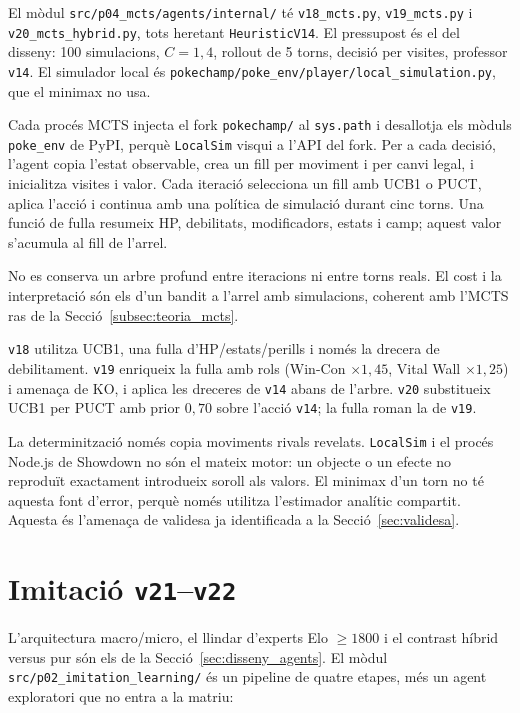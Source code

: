 El mòdul \texttt{src/p04\_mcts/agents/internal/} té \texttt{v18\_mcts.py}, \texttt{v19\_mcts.py} i \texttt{v20\_mcts\_hybrid.py}, tots heretant \texttt{HeuristicV14}. El pressupost és el del disseny: 100 simulacions, $C=1{,}4$, rollout de 5 torns, decisió per visites, professor \texttt{v14}. El simulador local és \texttt{pokechamp/poke\_env/player/local\_simulation.py}, que el minimax no usa.

Cada procés MCTS injecta el fork \texttt{pokechamp/} al \texttt{sys.path} i desallotja els mòduls \texttt{poke\_env} de PyPI, perquè \texttt{LocalSim} visqui a l'API del fork. Per a cada decisió, l'agent copia l'estat observable, crea un fill per moviment i per canvi legal, i inicialitza visites i valor. Cada iteració selecciona un fill amb UCB1 o PUCT, aplica l'acció i continua amb una política de simulació durant cinc torns. Una funció de fulla resumeix HP, debilitats, modificadors, estats i camp; aquest valor s'acumula al fill de l'arrel.

No es conserva un arbre profund entre iteracions ni entre torns reals. El cost i la interpretació són els d'un bandit a l'arrel amb simulacions, coherent amb l'MCTS ras de la Secció~\ref{subsec:teoria_mcts}.

\texttt{v18} utilitza UCB1, una fulla d'HP/estats/perills i només la drecera de debilitament. \texttt{v19} enriqueix la fulla amb rols (Win-Con $\times 1{,}45$, Vital Wall $\times 1{,}25$) i amenaça de KO, i aplica les dreceres de \texttt{v14} abans de l'arbre. \texttt{v20} substitueix UCB1 per PUCT amb prior $0{,}70$ sobre l'acció \texttt{v14}; la fulla roman la de \texttt{v19}.

La determinització només copia moviments rivals revelats. \texttt{LocalSim} i el procés Node.js de Showdown no són el mateix motor: un objecte o un efecte no reproduït exactament introdueix soroll als valors. El minimax d'un torn no té aquesta font d'error, perquè només utilitza l'estimador analític compartit. Aquesta és l'amenaça de validesa ja identificada a la Secció~\ref{sec:validesa}.

\section{Imitació \texttt{v21}--\texttt{v22}}
\label{sec:il_impl}

L'arquitectura macro/micro, el llindar d'experts Elo $\geq 1800$ i el contrast híbrid versus pur són els de la Secció~\ref{sec:disseny_agents}. El mòdul \texttt{src/p02\_imitation\_learning/} és un pipeline de quatre etapes, més un agent exploratori que no entra a la matriu:

